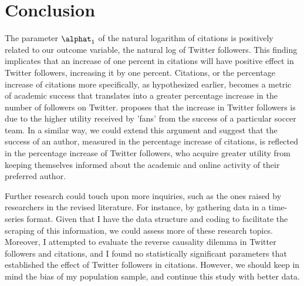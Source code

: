 \documentclass[12pt,english]{article}
\begin{document}
\section{Conclusion}\label{sec:conclusion}
The parameter $\alphat_{1}$ of the natural logarithm of citations is positively related to our outcome variable, the natural log of Twitter followers. This finding implicates that an increase of one percent in citations will have positive effect in Twitter followers, increasing it by one percent. Citations, or the percentage increase of citations more specifically, as hypothesized earlier, becomes a metric of academic success that translates into a greater percentage increase in the number of followers on Twitter. \cite{levi.soccer} proposes that the increase in Twitter followers is due to the higher utility received by 'fans' from the success of a particular soccer team. In a similar way, we could extend this argument and suggest that the success of an author, measured in the percentage increase of citations, is reflected in the percentage increase of Twitter followers, who acquire greater utility from keeping themselves informed about the academic and online activity of their preferred author.

Further research could touch upon more inquiries, such as the ones raised by researchers in the revised literature. For instance, by gathering data in a time-series format. Given that I have the data structure and coding to facilitate the scraping of this information, we could assess more of these research topics. Moreover, I attempted to evaluate the reverse causality dilemma in Twitter followers and citations, and I found no statistically significant parameters that established the effect of Twitter followers in citations. However, we should keep in mind the bias of my population sample, and continue this study with better data. 
 
\end{document}
